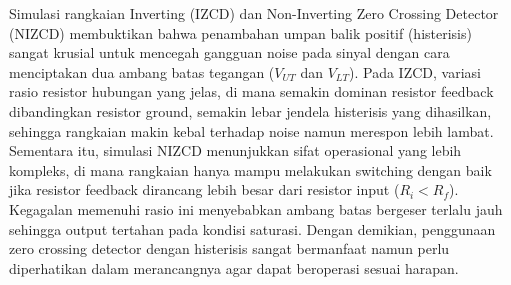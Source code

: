 \documentclass{article}
\begin{document}
Simulasi rangkaian Inverting (IZCD) dan Non-Inverting Zero Crossing Detector (NIZCD) membuktikan bahwa penambahan umpan balik positif (histerisis) sangat krusial untuk mencegah gangguan noise pada sinyal dengan cara menciptakan dua ambang batas tegangan ($V_{UT}$ dan $V_{LT}$). Pada IZCD, variasi rasio resistor hubungan yang jelas, di mana semakin dominan resistor feedback dibandingkan resistor ground, semakin lebar jendela histerisis yang dihasilkan, sehingga rangkaian makin kebal terhadap noise namun merespon lebih lambat. Sementara itu, simulasi NIZCD menunjukkan sifat operasional yang lebih kompleks, di mana rangkaian hanya mampu melakukan switching dengan baik jika resistor feedback dirancang lebih besar dari resistor input ($R_i < R_f$). Kegagalan memenuhi rasio ini menyebabkan ambang batas bergeser terlalu jauh sehingga output tertahan pada kondisi saturasi. Dengan demikian, penggunaan zero crossing detector dengan histerisis sangat bermanfaat namun perlu diperhatikan dalam merancangnya agar dapat beroperasi sesuai harapan.



\end{document}
